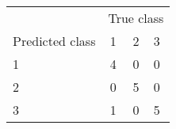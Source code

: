 \begin{tabular}{lccl}
  \hline
  & \multicolumn{3}{c}{True class}\\
 Predicted class & 1 & 2 & 3 \\
   \hline
1 &   4 &   0 &   0 \\ 
  2 &   0 &   5 &   0 \\ 
  3 &   1 &   0 &   5 \\ 
   \hline
\end{tabular}
